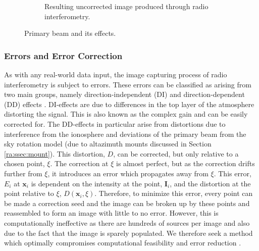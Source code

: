 \begin{figure}[H]
\begin{subfigure}{0.45\textwidth}
	\caption{Resulting uncorrected image produced through radio interferometry.}
	\label{ra:fig:uncorr}
  \end{subfigure}
  \caption{Primary beam and its effects.}
\end{figure}
%
\subsubsection{Errors and Error Correction}\label{ra:ssec:eec}
As with any real-world data input, the image capturing process of radio interferometry is subject to errors. These errors can be classified as arising from two main groups, namely direction-independent (DI) and direction-dependent (DD) effects \citep{smirnov2011revisiting}. DI-effects are due to differences in the top layer of the atmosphere distorting the signal. This is also known as the complex gain and can be easily corrected for. The DD-effects in particular arise from distortions due to interference from the ionosphere and deviations of the primary beam from the sky rotation model (due to altazimuth mounts discussed in Section \ref{ra:ssec:mount}). This distortion, $D$, can be corrected, but only relative to a chosen point, $\xi$. The correction at $\xi$ is almost perfect, but as the correction drifts further from $\xi$, it introduces an error which propagates away from $\xi$. This error, $E_i$ at $\boldsymbol{x}_i$ is dependent on the intensity at the point, $\boldsymbol{I}_i$, and the distortion at the point relative to $\xi$, $D(\boldsymbol{x}_i,\xi)$. Therefore, to minimize this error, every point can be made a correction seed and the image can be broken up by these points and reassembled to form an image with little to no error. However, this is computationally ineffective as there are hundreds of sources per image and also due to the fact that the image is sparely populated. We therefore seek a method which optimally compromises computational feasibility and error reduction \citep{smirnov2015radio}.
